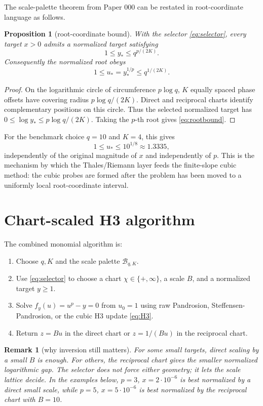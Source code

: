 \documentclass[11pt]{article}
\newtheorem{proposition}{Proposition}
\newtheorem{remark}{Remark}
\begin{document}
The scale-palette theorem from Paper 000 can be restated in root-coordinate language as follows.

\begin{proposition}[root-coordinate bound]
With the selector \eqref{eq:selector}, every target $x>0$ admits a normalized target satisfying
\[
1\le y_*\le q^{p/(2K)}.
\]
Consequently the normalized root obeys
\begin{equation}
1\le u_*=y_*^{1/p}\le q^{1/(2K)}.
\label{eq:rootbound}
\end{equation}
\end{proposition}

\begin{proof}
On the logarithmic circle of circumference $p\log q$, $K$ equally spaced phase offsets have covering radius $p\log q/(2K)$.  Direct and reciprocal charts identify complementary positions on this circle.  Thus the selected normalized target has $0\le\log y_*\le p\log q/(2K)$.  Taking the $p$-th root gives \eqref{eq:rootbound}.
\end{proof}

For the benchmark choice $q=10$ and $K=4$, this gives
\[
1\le u_*\le 10^{1/8}\approx1.3335,
\]
independently of the original magnitude of $x$ and independently of $p$.  This is the mechanism by which the Thales/Riemann layer feeds the finite-slope cubic method: the cubic probes are formed after the problem has been moved to a uniformly local root-coordinate interval.

\section{Chart-scaled H3 algorithm}
The combined monomial algorithm is:
\begin{enumerate}[leftmargin=2.2em]
\item Choose $q,K$ and the scale palette $\mathcal B_{q,K}$.
\item Use \eqref{eq:selector} to choose a chart $\chi\in\{+,\infty\}$, a scale $B$, and a normalized target $y\ge1$.
\item Solve $f_y(u)=u^p-y=0$ from $u_0=1$ using raw Pandrosion, Steffensen-Pandrosion, or the cubic H3 update \eqref{eq:H3}.
\item Return $z=Bu$ in the direct chart or $z=1/(Bu)$ in the reciprocal chart.
\end{enumerate}

\begin{remark}[why inversion still matters]
For some small targets, direct scaling by a small $B$ is enough.  For others, the reciprocal chart gives the smaller normalized logarithmic gap.  The selector does not force either geometry; it lets the scale lattice decide.  In the examples below, $p=3$, $x=2\cdot10^{-6}$ is best normalized by a direct small scale, while $p=5$, $x=5\cdot10^{-6}$ is best normalized by the reciprocal chart with $B=10$.
\end{remark}
\end{document}
